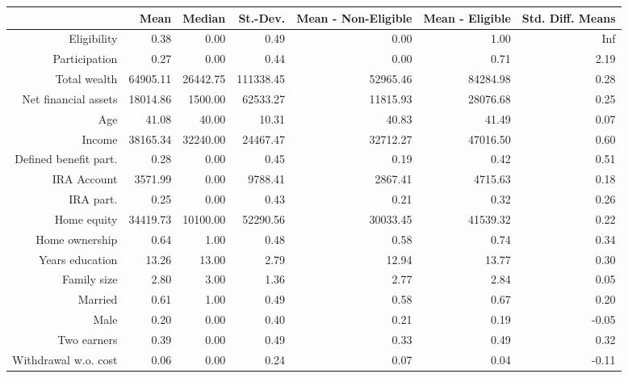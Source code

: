 \begin{table}[ht]
\centering
\begin{tabular}{rrrrrrr}
  \hline
 & Mean & Median & St.-Dev. & Mean - Non-Eligible & Mean - Eligible & Std. Diff. Means \\ 
  \hline
Eligibility & 0.38 & 0.00 & 0.49 & 0.00 & 1.00 & Inf \\ 
  Participation & 0.27 & 0.00 & 0.44 & 0.00 & 0.71 & 2.19 \\ 
  Total wealth & 64905.11 & 26442.75 & 111338.45 & 52965.46 & 84284.98 & 0.28 \\ 
  Net financial assets & 18014.86 & 1500.00 & 62533.27 & 11815.93 & 28076.68 & 0.25 \\ 
  Age & 41.08 & 40.00 & 10.31 & 40.83 & 41.49 & 0.07 \\ 
  Income & 38165.34 & 32240.00 & 24467.47 & 32712.27 & 47016.50 & 0.60 \\ 
  Defined benefit part. & 0.28 & 0.00 & 0.45 & 0.19 & 0.42 & 0.51 \\ 
  IRA Account & 3571.99 & 0.00 & 9788.41 & 2867.41 & 4715.63 & 0.18 \\ 
  IRA part. & 0.25 & 0.00 & 0.43 & 0.21 & 0.32 & 0.26 \\ 
  Home equity & 34419.73 & 10100.00 & 52290.56 & 30033.45 & 41539.32 & 0.22 \\ 
  Home ownership & 0.64 & 1.00 & 0.48 & 0.58 & 0.74 & 0.34 \\ 
  Years education & 13.26 & 13.00 & 2.79 & 12.94 & 13.77 & 0.30 \\ 
  Family size & 2.80 & 3.00 & 1.36 & 2.77 & 2.84 & 0.05 \\ 
  Married & 0.61 & 1.00 & 0.49 & 0.58 & 0.67 & 0.20 \\ 
  Male & 0.20 & 0.00 & 0.40 & 0.21 & 0.19 & -0.05 \\ 
  Two earners & 0.39 & 0.00 & 0.49 & 0.33 & 0.49 & 0.32 \\ 
  Withdrawal w.o. cost & 0.06 & 0.00 & 0.24 & 0.07 & 0.04 & -0.11 \\ 
   \hline
\end{tabular}
\end{table}
